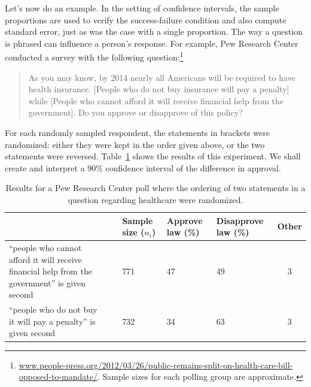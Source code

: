 
Let's now do an example.
In the setting of confidence intervals, the sample proportions are used to verify the success-failure condition and also compute standard error, just as was the case with a single proportion.
The way a question is phrased can influence a person's response. For example, Pew Research Center conducted a survey with the following question:\footnote{\href{http://www.people-press.org/2012/03/26/public-remains-split-on-health-care-bill-opposed-to-mandate/}{www.people-press.org/2012/03/26/public-remains-split-on-health-care-bill-opposed-to-mandate/}. Sample sizes for each polling group are approximate.}
\begin{quote}
As you may know, by 2014 nearly all Americans will be required to have health insurance. [People who do not buy insurance will pay a penalty] while [People who cannot afford it will receive financial help from the government]. Do you approve or disapprove of this policy?
\end{quote}
For each randomly sampled respondent, the statements in brackets were randomized: either they were kept in the order given above, or the two statements were reversed. Table~\ref{pewPollResultsForRandomizedStatementOrdering} shows the results of this experiment. 
We shall create and interpret a 90\% confidence interval of the difference in approval.

\begin{table}[H]
\centering
\begin{tabular}{p{50mm}c p{13mm}p{14mm}p{16.5mm}c}
	&\ & Sample size ($n_i$) & Approve law (\%)	& Disapprove law (\%)	& Other \\
\hline
``people who cannot afford it will receive financial help from the government'' is given second \vspace{2.5mm}
	& & 771	& 47	& 49	& 3 \\
``people who do not buy it will pay a penalty'' is given second
	& & 732	& 34	& 63	& 3 \\
\hline
\end{tabular}
\captionsetup{width=0.8\textwidth}
\caption{Results for a Pew Research Center poll where the ordering of two statements in a question regarding healthcare were randomized.}
\label{pewPollResultsForRandomizedStatementOrdering}
\end{table}

